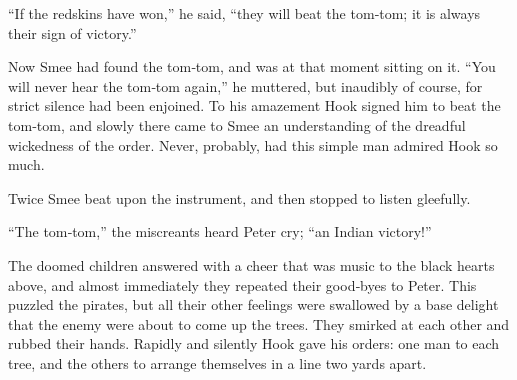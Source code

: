 “If the redskins have won,” he said, “they will beat the tom‐tom;
it is always their sign of victory.”

Now Smee had found the tom‐tom, and was at that moment sitting on it.
“You will never hear the tom‐tom again,” he muttered,
but inaudibly of course, for strict silence had been enjoined.
To his amazement Hook signed him to beat the tom‐tom,
and slowly there came to Smee an understanding of the dreadful wickedness of the order.
Never, probably, had this simple man admired Hook so much.

Twice Smee beat upon the instrument, and then stopped to listen gleefully.

“The tom‐tom,” the miscreants heard Peter cry;
“an Indian victory!”

The doomed children answered with a cheer that was music to the black hearts above,
and almost immediately they repeated their good‐byes to Peter.
This puzzled the pirates,
but all their other feelings were swallowed by a base delight that the enemy were about to come up the trees.
They smirked at each other and rubbed their hands.
Rapidly and silently Hook gave his orders:
one man to each tree, and the others to arrange themselves in a line two yards apart.

\endinput
